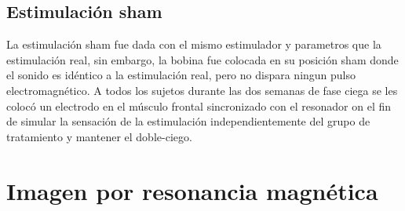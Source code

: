 \subsection{Estimulación sham}
La estimulación sham fue dada con el mismo estimulador y parametros que la estimulación real, sin embargo, la bobina fue colocada en su posición sham donde el sonido es idéntico a la estimulación real, pero no dispara ningun pulso electromagnético.
A todos los sujetos durante las dos semanas de fase ciega se les colocó un electrodo en el músculo frontal sincronizado con el resonador on el fin de simular la sensación de la estimulación independientemente del grupo de tratamiento y mantener el doble-ciego.

\section{Imagen por resonancia magnética}

